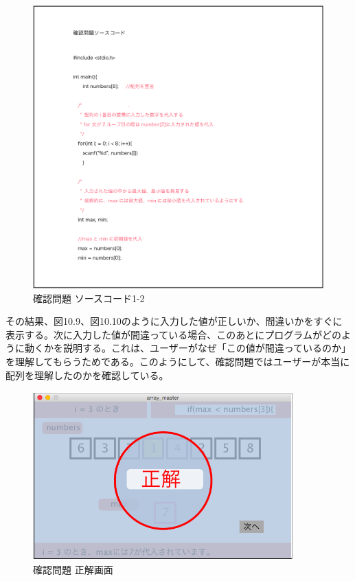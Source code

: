 \documentclass[openany,11pt,papersize]{jsbook}
\begin{document}
\begin{figure}[H]
\begin{center}
\includegraphics[width=14cm, bb=0 0 2545 2474]{img/9thParagraph/kakuninmondai_04.png}
\end{center}
\caption{確認問題 ソースコード1-2}
\end{figure}

その結果、図10.9、図10.10のように入力した値が正しいか、間違いかをすぐに表示する。次に入力した値が間違っている場合、このあとにプログラムがどのように動くかを説明する。これは、ユーザーがなぜ「この値が間違っているのか」を理解してもらうためである。このようにして、確認問題ではユーザーが本当に配列を理解したのかを確認している。


\begin{figure}[H]
\begin{center}
\includegraphics[width=10cm, bb=0 0 645 418]{img/9thParagraph/kakuninmondai_05.png}
\end{center}
\caption{確認問題 正解画面}
\end{figure}
\end{document}
